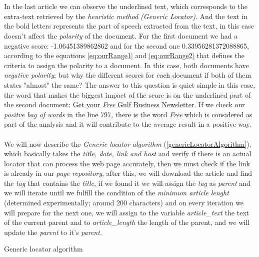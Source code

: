 \\\\
In the last article we can observe the underlined text, which corresponds to the extra-text retrieved by the \emph{heuristic method (Generic Locator)}. And the text in the bold letters represents the part of speech extracted from the text, in this case doesn't affect the \emph{polarity} of the document. For the first document we had a negative score: -1.06451389862862 and for the second one 0.33956281372088865, according to the equations \ref{eq:ourRange1} and \ref{eq:ourRange2} that defines the criteria to assign the polarity to a document. In this case, both documents have \emph{negative polarity}; but why the different scores for each document if both of them states "almost" the same? The answer to this question is quiet simple in this case, the word that makes the biggest impact of the score is on the underlined part of the second document: \ul{Get your \emph{Free} Gulf Business Newsletter}. If we check our \emph{positve bag of words} in the line 797, there is the word \emph{Free} which is considered as part of the analysis and it will contribute to the average result in a positive way.
\\\\
We will now describe the \emph{Generic locator algorithm} (\ref{genericLocatorAlgorithm}), which basically takes the \emph{title, date, link and host} and verify if there is an actual locator that can process the web page accurately, then we must check if the link is already in our \emph{page repository}, after this, we will download the article and find the \emph{tag} that contains the \emph{title}, if we found it we will assign the \emph{tag} as \emph{parent} and we will iterate until we fulfill the condition of the \emph{minimum article lenght} (determined experimentally; around 200 characters) and on every iteration we will prepare for the next one, we will assign to the variable \emph{article\_text} the text of the current parent and to \emph{article\_length} the length of the parent, and we will update the \emph{parent} to it's \emph{parent}.

\begin{algorithm}
\caption{Generic locator algorithm}\label{genericLocatorAlgorithm}
\end{algorithm}

